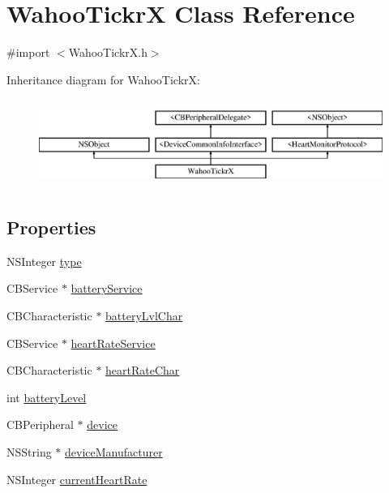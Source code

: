 \hypertarget{interface_wahoo_tickr_x}{\section{Wahoo\-Tickr\-X Class Reference}
\label{interface_wahoo_tickr_x}
}


{\ttfamily \#import $<$Wahoo\-Tickr\-X.\-h$>$}

Inheritance diagram for Wahoo\-Tickr\-X\-:\begin{figure}[H]
\begin{center}
\leavevmode
\includegraphics[height=2.901554cm]{interface_wahoo_tickr_x}
\end{center}
\end{figure}
\subsection*{Properties}
\begin{DoxyCompactItemize}
\item 
N\-S\-Integer \hyperlink{interface_wahoo_tickr_x_a96e73fccf071a4f3406e51a833a4756a}{type}
\item 
C\-B\-Service $\ast$ \hyperlink{interface_wahoo_tickr_x_a4dc92d682d3e9734886c0356bdb86bbf}{battery\-Service}
\item 
C\-B\-Characteristic $\ast$ \hyperlink{interface_wahoo_tickr_x_a664a0a704cfea55c60ddf4dbcad3bf35}{battery\-Lvl\-Char}
\item 
C\-B\-Service $\ast$ \hyperlink{interface_wahoo_tickr_x_ae712f8d6cd74c8fb0b1093f45e7ee6e3}{heart\-Rate\-Service}
\item 
C\-B\-Characteristic $\ast$ \hyperlink{interface_wahoo_tickr_x_a8d2500c6e9eb3493393631b3bad7f7e7}{heart\-Rate\-Char}
\item 
int \hyperlink{interface_wahoo_tickr_x_a95ae53406af5abb3d47d51d0f60c228b}{battery\-Level}
\item 
C\-B\-Peripheral $\ast$ \hyperlink{interface_wahoo_tickr_x_a1150e7cbd797825676de42644f16bb93}{device}
\item 
N\-S\-String $\ast$ \hyperlink{interface_wahoo_tickr_x_ad669444b5987b9b1c69f3f74ad21e7eb}{device\-Manufacturer}
\item 
N\-S\-Integer \hyperlink{interface_wahoo_tickr_x_a83d9f36650e71b239075074c551a0185}{current\-Heart\-Rate}
\end{DoxyCompactItemize}

